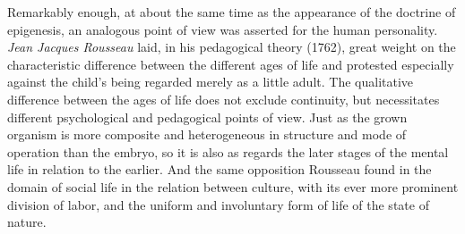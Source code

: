\documentclass[12pt,a4paper]{book}
\newcommand{\opage}[1]{\marginnote{\footnotesize\textit{[#1]}}}
\begin{document}
Remarkably enough, at about the same time as the appearance of the doctrine
of epigenesis, an analogous point of view was asserted for the human
personality. \emph{Jean Jacques Rousseau} laid, in his pedagogical theory
(1762), great weight on the characteristic difference between the different
ages of life and protested especially against the child's being regarded
merely as a little adult. The qualitative difference between the ages of life
does not exclude continuity, but necessitates different psychological and
pedagogical points of view. Just as the grown organism is more composite and
heterogeneous in structure and mode of operation than the embryo, so it is
also as regards the later stages of the mental life in relation to the
earlier. And the same opposition Rousseau found in the domain of social life
in the relation between \opage{231}culture, with its ever more prominent division of
labor, and the uniform and involuntary form of life of the state of nature.
\end{document}
